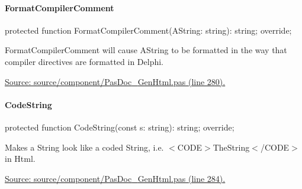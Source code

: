 \documentclass{report}
\newif\ifpdf
\begin{document}
\paragraph*{FormatCompilerComment}\hspace*{\fill}

\label{PasDoc_GenHtml.TGenericHTMLDocGenerator-FormatCompilerComment}
\begin{list}{}{
\setlength{\itemindent}{0cm}
\setlength{\listparindent}{0cm}
\setlength{\leftmargin}{\evensidemargin}
\addtolength{\leftmargin}{\tmplength}
\settowidth{\labelsep}{X}
\addtolength{\leftmargin}{\labelsep}
\setlength{\labelwidth}{\tmplength}
}
\item[\textbf{Declaration}\hfill]
\ifpdf
\begin{flushleft}
\fi
\begin{ttfamily}
protected function FormatCompilerComment(AString: string): string; override;\end{ttfamily}

\ifpdf
\end{flushleft}
\fi

\par
\item[\textbf{Description}]
FormatCompilerComment will cause AString to be formatted in the way that compiler directives are formatted in Delphi.\par
\href{https://github.com/pasdoc/pasdoc/blob/master/source/component/PasDoc_GenHtml.pas#L280}{Source: source/component/PasDoc{\_}GenHtml.pas (line 280).}

\end{list}
\paragraph*{CodeString}\hspace*{\fill}

\label{PasDoc_GenHtml.TGenericHTMLDocGenerator-CodeString}
\begin{list}{}{
\setlength{\itemindent}{0cm}
\setlength{\listparindent}{0cm}
\setlength{\leftmargin}{\evensidemargin}
\addtolength{\leftmargin}{\tmplength}
\settowidth{\labelsep}{X}
\addtolength{\leftmargin}{\labelsep}
\setlength{\labelwidth}{\tmplength}
}
\item[\textbf{Declaration}\hfill]
\ifpdf
\begin{flushleft}
\fi
\begin{ttfamily}
protected function CodeString(const s: string): string; override;\end{ttfamily}

\ifpdf
\end{flushleft}
\fi

\par
\item[\textbf{Description}]
Makes a String look like a coded String, i.e. {$<$}CODE{$>$}TheString{$<$}/CODE{$>$} in Html.\par
\href{https://github.com/pasdoc/pasdoc/blob/master/source/component/PasDoc_GenHtml.pas#L284}{Source: source/component/PasDoc{\_}GenHtml.pas (line 284).}

\end{list}
\end{document}
